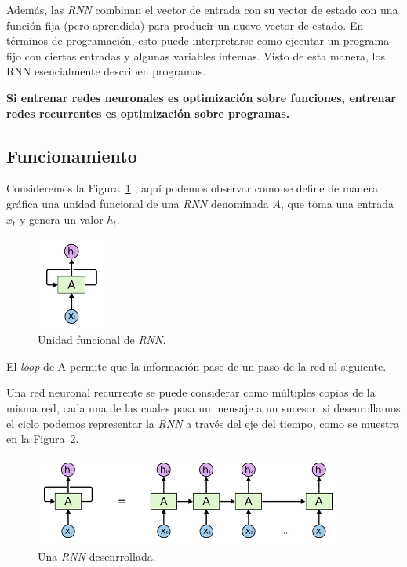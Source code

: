 \documentclass[a4paper,12pt]{article}
\begin{document}
Además, las \textit{RNN} combinan el vector de entrada con su vector de estado con una función fija (pero aprendida) para producir un nuevo vector de estado. En términos de programación, esto puede interpretarse como ejecutar un programa fijo con ciertas entradas y algunas variables internas. Visto de esta manera, los RNN esencialmente describen programas.

\textbf{Si entrenar redes neuronales es optimización sobre funciones, entrenar redes recurrentes es optimización sobre programas.}

\subsection{Funcionamiento}

Consideremos la Figura~\ref{fig:rnnunit} \citep{olahlstm}, aquí podemos observar como se define de manera gráfica una unidad funcional de una \textit{RNN} denominada $A$, que toma una entrada $x_t$ y genera un valor $h_t$.

\begin{figure}[H]
	\begin{center}				
	\includegraphics[width=0.2\textwidth]{tesis_27.png}
  	\caption{Unidad funcional de \textit{RNN}.}
  	\label{fig:rnnunit}
  	\end{center}
\end{figure}

El \textit{loop} de A permite que la información pase de un paso de la red al siguiente.

Una red neuronal recurrente se puede considerar como múltiples copias de la misma red, cada una de las cuales pasa un mensaje a un sucesor. si desenrollamos el ciclo podemos representar la \textit{RNN} a través del eje del tiempo, como se muestra en la Figura~\ref{fig:rnnunrolled}.

\begin{figure}[H]
	\begin{center}
	\includegraphics[width=0.9\textwidth]{tesis_28.png}
  	\caption{Una \textit{RNN} desenrrollada.}
  	\label{fig:rnnunrolled}
  	\end{center}
\end{figure}
\end{document}
